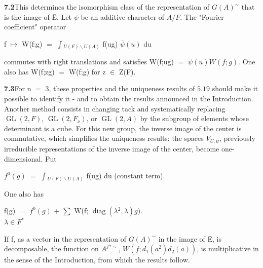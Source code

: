 \documentclass[10pt,a4paper]{article}
\begin{document}
\par\noindent\textbf{7.2}\quad This determines the isomorphism class of the representation of $G(A)^\sim$ that is the image of Ē. Let $\psi{}$ be an additive character of $A/F$. The "Fourier coefficient" operator\par
\par f $\mapsto{}$ W(f;g) $=$ $\int{}_{U(F)\backslash U(A)}$ f(ug) $\overline{\psi{}}(u)$ du\par
\par commutes with right translations and satisfies W(f;ug) $=$ $\psi{}(u)W(f;g)$. One also has W(f;zg) $=$ W(f;g) for z $\in{}$ Z(F).\par
\par\noindent\textbf{7.3}\quad For n $=$ 3, these properties and the uniqueness results of $5.19$ should make it possible to identify it - and to obtain the results announced in the Introduction. Another method consists in changing tack and systematically replacing $\operatorname{GL}(2,F)$, $\operatorname{GL}(2,F_\nu{})$, or $\operatorname{GL}(2,A)$ by the subgroup of elements whose determinant is a cube. For this new group, the inverse image of the center is commutative, which simplifies the uniqueness results: the spaces $V_{U,\psi{}}$, previously irreducible representations of the inverse image of the center, become one-dimensional. Put\par
\par $f^0(g)$ $=$ $\int{}_{U(F)\backslash U(A)}$ f(ug) du (constant term).\par
\par One also has\par
\par\smallskip\begin{center}\begin{minipage}{0.96\textwidth}\centering
f(g) $=$ $f^0(g)$ + $\sum{}$ W(f; $\operatorname{diag}(\lambda{}^2,\lambda{})g)$. \\ $\lambda{}\in{}F^*$
\end{minipage}\end{center}\smallskip

\clearpage
{}
\label{d035-physical-032}
\par If f, as a vector in the representation of $G(A)^\sim$ in the image of Ē, is decomposable, the function on $A^{f*\sim}$, $W(f;d_1(a^2)d_2(a))$, is multiplicative in the sense of the Introduction, from which the results follow.\par
\end{document}
